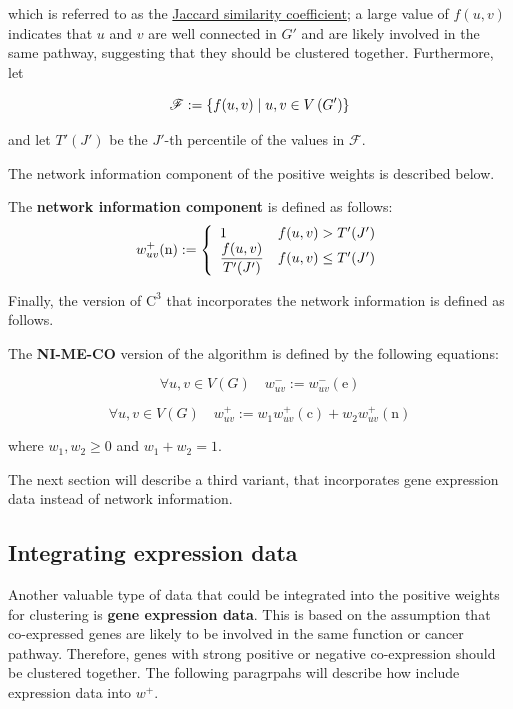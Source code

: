 which is referred to as the \href{https://en.wikipedia.org/wiki/Jaccard_index}{Jaccard similarity coefficient}; a large value of $f(u, v)$ indicates that $u$ and $v$ are well connected in $G'$ and are likely involved in the same pathway, suggesting that they should be clustered together. Furthermore, let

\begin{equation}
    \mathscr{F} := \{f(u, v) \mid u, v \in V\rbk{G'}\}
\end{equation}

and let $T'(J')$ be the $J'$-th percentile of the values in $\mathscr F$.

The network information component of the positive weights is described below.

\begin{definition}
    The \textbf{network information component} is defined as follows: $$w_{uv}^+(\mathrm n) := \soe{ll}{1 & f(u, v) > T'(J') \\ \dfrac{f(u, v)}{T'(J')} & f(u, v) \le T'(J')}$$
\end{definition}

Finally, the version of $\mathrm{C}^3$ that incorporates the network information is defined as follows.

\begin{definition}[NI-ME-CO]
    The \textbf{NI-ME-CO} version of the algorithm is defined by the following equations:

    \begin{equation}
        \forall u, v \in V(G) \quad w_{uv}^- := w_{uv}^-(\mathrm e)
    \end{equation}

    \begin{equation}
        \forall u, v \in V(G) \quad w_{uv}^+ := w_1 w_{uv}^+(\mathrm c) + w_2 w_{uv}^+(\mathrm n)
    \end{equation}

    where $w_1, w_2 \ge 0$ and $w_1 + w_2 = 1$.
\end{definition}

The next section will describe a third variant, that incorporates gene expression data instead of network information.

\subsection{Integrating expression data}

Another valuable type of data that could be integrated into the positive weights for clustering is \textbf{gene expression data}. This is based on the assumption that co-expressed genes are likely to be involved in the same function or cancer pathway. Therefore, genes with strong positive or negative co-expression should be clustered together. The following paragrpahs will describe how \textcite{c3} include expression data into $w^+$.

